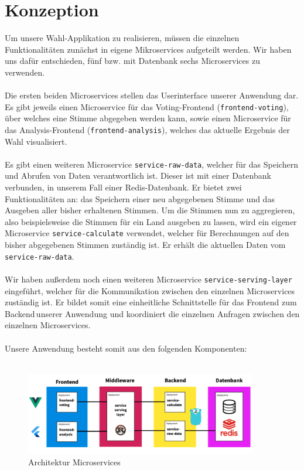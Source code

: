 \section{Konzeption}
Um unsere Wahl-Applikation zu realisieren, müssen die einzelnen Funktionalitäten zunächst in eigene Mikroservices aufgeteilt werden. Wir haben uns dafür entschieden, fünf bzw. mit Datenbank sechs Microservices zu verwenden.
\\\\
Die ersten beiden Microservices stellen das Userinterface unserer Anwendung dar. Es gibt jeweils einen Microservice für das Voting-Frontend (\lstinline{frontend-voting}), über welches eine Stimme abgegeben werden kann, sowie einen Microservice für das Analysis-Frontend (\lstinline{frontend-analysis}), welches das aktuelle Ergebnis der Wahl visualisiert.
\\\\
Es gibt einen weiteren Microservice \lstinline{service-raw-data}, welcher für das Speichern und Abrufen von Daten verantwortlich ist. Dieser ist mit einer Datenbank verbunden, in unserem Fall einer Redis-Datenbank. Er bietet zwei Funktionalitäten an: das Speichern einer neu abgegebenen Stimme und das Ausgeben aller bisher erhaltenen Stimmen. Um die Stimmen nun zu aggregieren, also beispielsweise die Stimmen für ein Land ausgeben zu lassen, wird ein eigener Microservice \lstinline{service-calculate} verwendet, welcher für Berechnungen auf den bisher abgegebenen Stimmen zuständig ist. Er erhält die aktuellen Daten vom \lstinline{service-raw-data}.
\\\\
Wir haben außerdem noch einen weiteren Microservice \lstinline{service-serving-layer} eingeführt, welcher für die Kommunikation zwischen den einzelnen Microservices zuständig ist. Er bildet somit eine einheitliche Schnittstelle für das Frontend zum \dq Backend\dq\,unserer Anwendung und koordiniert die einzelnen Anfragen zwischen den einzelnen Microservices.
\\\\
Unsere Anwendung besteht somit aus den folgenden Komponenten:
\\\\
\begin{figure}[bth]
  \centering
  \includegraphics[width=0.9\textwidth]{Chapters/5-Fallstudie/Graphics/SA-Architektur.png}
  \caption{Architektur Microservices}
  \label{fig:architecture}
\end{figure}
